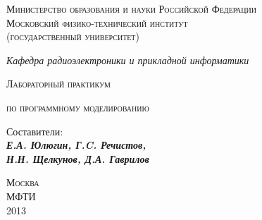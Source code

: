 
\thispagestyle{empty}

\begin{center}
\small
\textsc{Министерство образования и науки Российской Федерации \\
    Московский физико-технический институт \\
    (государственный университет) \\
}
\end{center}

\begin{center}
\textit{Кафедра радиоэлектроники и прикладной информатики}
\end{center}

\vfill

\begin{center}
    \begin{LARGE}
    \textsc{Лабораторный практикум}\par
    \end{LARGE}
    \medskip
    \begin{Large}
    \textsc{по программному моделированию}
    \end{Large}
\end{center}

\vfill

\begin{center}
\begin{large}
Составители: \\
\textit{\textbf{Е.А. Юлюгин, Г.C. Речистов, \\
    Н.Н. Щелкунов, Д.А. Гаврилов}}
\end{large}
\end{center}

\vfill

\begin{center}
    \textsc{Москва}\\
    \textsc{МФТИ}\\
    2013
\end{center}
